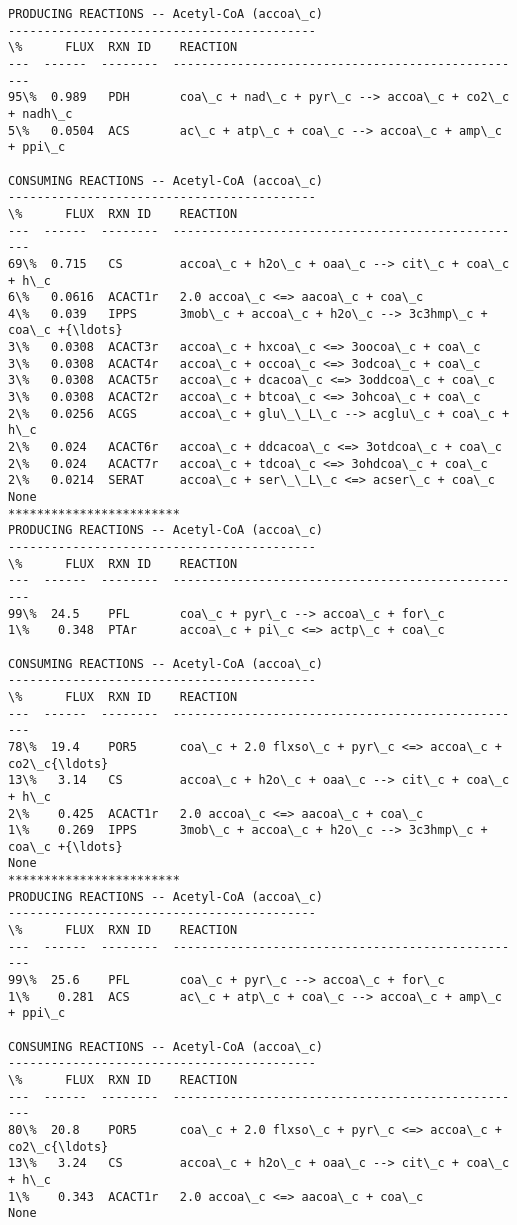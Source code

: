 \documentclass[11pt]{article}
\begin{document}
    \begin{Verbatim}[commandchars=\\\{\}]
PRODUCING REACTIONS -- Acetyl-CoA (accoa\_c)
-------------------------------------------
\%      FLUX  RXN ID    REACTION
---  ------  --------  --------------------------------------------------
95\%  0.989   PDH       coa\_c + nad\_c + pyr\_c --> accoa\_c + co2\_c + nadh\_c
5\%   0.0504  ACS       ac\_c + atp\_c + coa\_c --> accoa\_c + amp\_c + ppi\_c

CONSUMING REACTIONS -- Acetyl-CoA (accoa\_c)
-------------------------------------------
\%      FLUX  RXN ID    REACTION
---  ------  --------  --------------------------------------------------
69\%  0.715   CS        accoa\_c + h2o\_c + oaa\_c --> cit\_c + coa\_c + h\_c
6\%   0.0616  ACACT1r   2.0 accoa\_c <=> aacoa\_c + coa\_c
4\%   0.039   IPPS      3mob\_c + accoa\_c + h2o\_c --> 3c3hmp\_c + coa\_c +{\ldots}
3\%   0.0308  ACACT3r   accoa\_c + hxcoa\_c <=> 3oocoa\_c + coa\_c
3\%   0.0308  ACACT4r   accoa\_c + occoa\_c <=> 3odcoa\_c + coa\_c
3\%   0.0308  ACACT5r   accoa\_c + dcacoa\_c <=> 3oddcoa\_c + coa\_c
3\%   0.0308  ACACT2r   accoa\_c + btcoa\_c <=> 3ohcoa\_c + coa\_c
2\%   0.0256  ACGS      accoa\_c + glu\_\_L\_c --> acglu\_c + coa\_c + h\_c
2\%   0.024   ACACT6r   accoa\_c + ddcacoa\_c <=> 3otdcoa\_c + coa\_c
2\%   0.024   ACACT7r   accoa\_c + tdcoa\_c <=> 3ohdcoa\_c + coa\_c
2\%   0.0214  SERAT     accoa\_c + ser\_\_L\_c <=> acser\_c + coa\_c
None
************************
PRODUCING REACTIONS -- Acetyl-CoA (accoa\_c)
-------------------------------------------
\%      FLUX  RXN ID    REACTION
---  ------  --------  --------------------------------------------------
99\%  24.5    PFL       coa\_c + pyr\_c --> accoa\_c + for\_c
1\%    0.348  PTAr      accoa\_c + pi\_c <=> actp\_c + coa\_c

CONSUMING REACTIONS -- Acetyl-CoA (accoa\_c)
-------------------------------------------
\%      FLUX  RXN ID    REACTION
---  ------  --------  --------------------------------------------------
78\%  19.4    POR5      coa\_c + 2.0 flxso\_c + pyr\_c <=> accoa\_c + co2\_c{\ldots}
13\%   3.14   CS        accoa\_c + h2o\_c + oaa\_c --> cit\_c + coa\_c + h\_c
2\%    0.425  ACACT1r   2.0 accoa\_c <=> aacoa\_c + coa\_c
1\%    0.269  IPPS      3mob\_c + accoa\_c + h2o\_c --> 3c3hmp\_c + coa\_c +{\ldots}
None
************************
PRODUCING REACTIONS -- Acetyl-CoA (accoa\_c)
-------------------------------------------
\%      FLUX  RXN ID    REACTION
---  ------  --------  --------------------------------------------------
99\%  25.6    PFL       coa\_c + pyr\_c --> accoa\_c + for\_c
1\%    0.281  ACS       ac\_c + atp\_c + coa\_c --> accoa\_c + amp\_c + ppi\_c

CONSUMING REACTIONS -- Acetyl-CoA (accoa\_c)
-------------------------------------------
\%      FLUX  RXN ID    REACTION
---  ------  --------  --------------------------------------------------
80\%  20.8    POR5      coa\_c + 2.0 flxso\_c + pyr\_c <=> accoa\_c + co2\_c{\ldots}
13\%   3.24   CS        accoa\_c + h2o\_c + oaa\_c --> cit\_c + coa\_c + h\_c
1\%    0.343  ACACT1r   2.0 accoa\_c <=> aacoa\_c + coa\_c
None

    \end{Verbatim}
\end{document}
